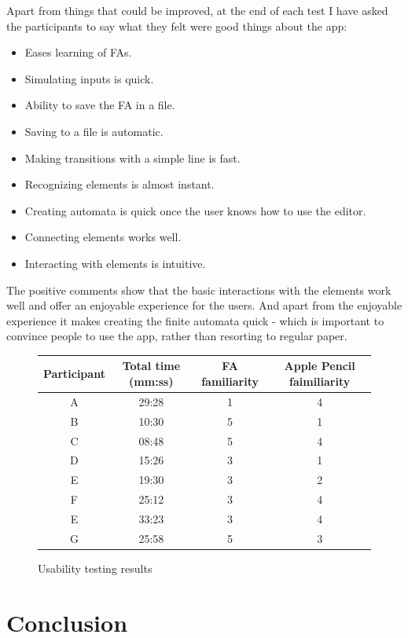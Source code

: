 Apart from things that could be improved, at the end of each test I have asked the participants to say what they felt were good things about the app:
\begin{itemize}
    \item Eases learning of FAs.
    \item Simulating inputs is quick.
    \item Ability to save the FA in a file.
    \item Saving to a file is automatic.
    \item Making transitions with a simple line is fast.
    \item Recognizing elements is almost instant.
    \item Creating automata is quick once the user knows how to use the editor.
    \item Connecting elements works well.
    \item Interacting with elements is intuitive.
\end{itemize}
The positive comments show that the basic interactions with the elements work well and offer an enjoyable experience for the users. And apart from the enjoyable experience it makes creating the finite automata quick - which is important to convince people to use the app, rather than resorting to regular paper.

\begin{figure}
\begin{tabular}{||c|c|c|c||} 
    \hline
    Participant & Total time (mm:ss) & FA familiarity & Apple Pencil faimiliarity \\ [0.5ex] 
    \hline\hline
    A & 29:28 & 1 & 4\\ 
    \hline
    B & 10:30 & 5 & 1\\ 
    \hline
    C & 08:48 & 5 & 4\\ 
    \hline
    D & 15:26 & 3 & 1\\ 
    \hline
    E & 19:30 & 3 & 2\\ 
    \hline
    F & 25:12 & 3 & 4\\ 
    \hline
    E & 33:23 & 3 & 4\\ 
    \hline
    G & 25:58 & 5 & 3\\ 
    \hline
\end{tabular}
\caption{Usability testing results}\label{test-results}
\end{figure}

\chapter{Conclusion}

